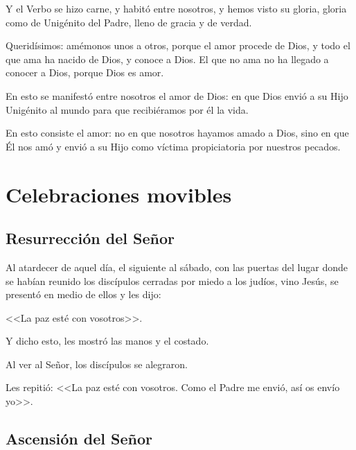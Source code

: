  Y el Verbo se 
hizo carne, y habitó entre nosotros, y hemos 
visto su gloria, gloria como de Unigénito del 
Padre, lleno de gracia y de verdad. 





 Queridísimos: amémonos unos a otros, porque 
el amor procede de Dios, y todo el que ama ha 
nacido de Dios, y conoce a Dios. El que no ama 
no ha llegado a conocer a Dios, porque Dios es 
amor. 

 En esto se manifestó entre nosotros el 
amor de Dios: en que Dios envió a su Hijo 
Unigénito al mundo para que recibiéramos por 
él la vida.  

En esto consiste el amor: no en que nosotros hayamos amado a Dios, sino en que 
Él nos amó y envió a su Hijo como víctima 
propiciatoria por nuestros pecados. 

\newpage

\section{Celebraciones movibles}

\subsection{Resurrección del Señor}



 Al atardecer de aquel día, el siguiente al 
sábado, con las puertas del lugar donde se 
habían reunido los discípulos cerradas por 
miedo a los judíos, vino Jesús, se presentó en 
medio de ellos y les dijo: 

<<La paz esté con vosotros>>. 

Y dicho esto, les mostró las manos y 
el costado. 

Al ver al Señor, los discípulos se 
alegraron. 

Les repitió: <<La paz esté con 
vosotros. Como el Padre me envió, así os envío 
yo>>. 


\subsection{Ascensión del Señor }



